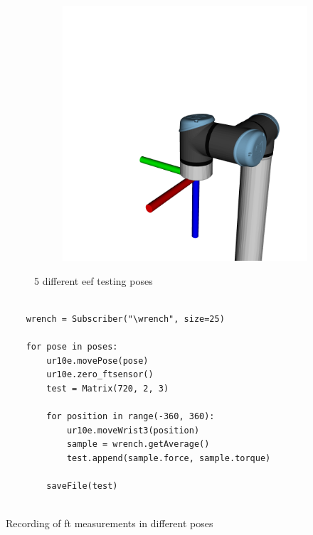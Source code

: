 \begin{figure}[h]
\begin{subfigure}{.2\linewidth}
        \label{fig:eef_p4}
    \end{subfigure}%
    \begin{subfigure}{.2\linewidth}
        \centering
        \includegraphics[width=\linewidth]{figs/chp3/P5.png}
        \label{fig:eef_p5}
    \end{subfigure}
    \caption{5 different \ac{eef} testing poses}
    \label{fig:eef_5_position}
\end{figure}

\begin{listing}[h]
    \centering
    \begin{verbatim}

    wrench = Subscriber("\wrench", size=25)
    
    for pose in poses:
        ur10e.movePose(pose)
        ur10e.zero_ftsensor()
        test = Matrix(720, 2, 3)

        for position in range(-360, 360):
            ur10e.moveWrist3(position)
            sample = wrench.getAverage()
            test.append(sample.force, sample.torque)
        
        saveFile(test)   
    
    \end{verbatim}
\caption{Recording of \ac{ft} measurements in different poses}
\label{code:w3_test}
\end{listing}

